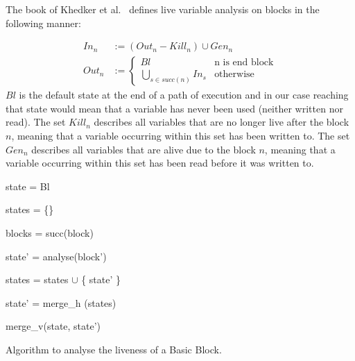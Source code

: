 The book of Khedker et al.~ \cite{khedker2009data} defines live variable analysis on blocks in the following manner:

\begin{center}
\begin{subequations}
\label{eq:livenessbasedef}
\begin{align}
In_n &:= (Out_n - Kill_n) \cup Gen_n \label{eq:livenessbasedefIn} \\
Out_n &:= \left\{
  \begin{array}{lr}
    Bl & \text{n is end block}\\
    \underset{s \in succ(n)}{\bigcup} In_s & \text{otherwise}
  \end{array}
\right. \label{eq:livenessbasedefOut}
\end{align}
\end{subequations}
$Bl$ is the default state at the end of a path of execution and in our case reaching 
that state would mean that a variable has never been used (neither written nor read). 
The set $Kill_n$ describes all variables that are no longer live after the block $n$, 
meaning that a variable occurring within this set has been written to. The set $Gen_n$ 
describes all variables that are alive due to the block $n$, 
meaning that a variable occurring within this set has been read before it was written to.

\begin{algorithm}[!h]
	\SetAlgoLined
	{
 	state = Bl
 	

	states = \{\}
	
	blocks = succ(block)
	
	 {
	
 		state' = analyse(block')
 		
		states = states $\cup$ \{ state' \}
	}

	state' = merge\_h (states)

	\Return merge\_v(state, state')

	}
\caption{Algorithm to analyse the liveness of a Basic Block.}
\label{alg:liveness}
\end{algorithm}
\end{center}

